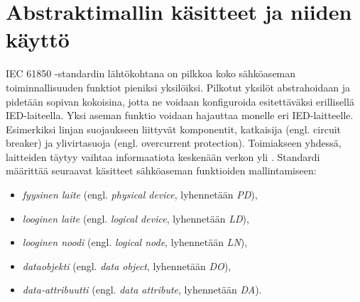 \section{Abstraktimallin käsitteet ja niiden käyttö}
IEC 61850 -standardin lähtökohtana on pilkkoa koko sähköaseman toiminnallisuuden funktiot pieniksi yksilöiksi. Pilkotut yksilöt abstrahoidaan ja pidetään sopivan kokoisina, jotta ne voidaan konfiguroida esitettäväksi erillisellä IED-laiteella. Yksi aseman funktio voidaan hajauttaa monelle eri IED-laitteelle. Esimerkiksi linjan suojaukseen liittyvät komponentit, katkaisija (engl. circuit breaker) ja ylivirtasuoja (engl. overcurrent protection). Toimiakseen yhdessä, laitteiden täytyy vaihtaa informaatiota keskenään verkon yli \mbox{\cite[s.~31]{IEC61850-7-1}}. Standardi määrittää seuraavat käsitteet sähköaseman funktioiden mallintamiseen:
\begin{itemize}
	\item \emph{fyysinen laite} (engl. \emph{physical device}, lyhennetään \emph{PD}),
	\item \emph{looginen laite} (engl. \emph{logical device}, lyhennetään \emph{LD}),
	\item \emph{looginen noodi} (engl. \emph{logical node}, lyhennetään \emph{LN}),
	\item \emph{dataobjekti} (engl. \emph{data object}, lyhennetään \emph{DO}),
	\item \emph{data-attribuutti} (engl. \emph{data attribute}, lyhennetään \emph{DA}).
\end{itemize}
